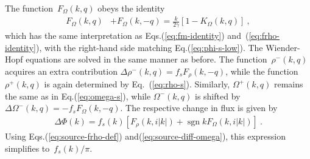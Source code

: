 \documentclass[preprint,aps,eqsecnum, prb]{revtex4-1}
\newcommand{\fplus}[1]{{#1}^{+}}
\newcommand{\fminus}[1]{{#1}^{-}}
\renewcommand{\Im}{\mathop{\mathrm{Im}}\nolimits}
\newcommand{\sgn}{\mathop{\mathrm{sgn}}\nolimits}
\begin{document}
The function~$F_\Omega(k, q)$ obeys the identity
\begin{align}
\label{eq:fomega-identity}
F_\Omega(k, q) & + F_\Omega(k, -q)
        = \frac{k}{2\gamma} \left[1 - K_\Omega(k, q)\right]
\ ,
\end{align}
which has the same interpretation as Eqs.(\ref{eq:fm-identity})
and~(\ref{eq:frho-identity}), with the right-hand side
matching Eq.(\ref{eq:phi-s-low}).
The Wiender-Hopf equations are solved in the same manner as before.
The function~$\fminus{\rho}(k, q)$ acquires an extra contribution
$\Delta \fminus{\rho}(k, q) = f_s F_\rho(k, -q)$, while
the function~$\fplus{\rho}(k, q)$ is again determined 
by Eq.~(\ref{eq:rho-s}). Similarly, $\fplus{\Omega}(k, q)$
remains the same as in Eq.(\ref{eq:omega-s}),
while $\fminus{\Omega}(k, q)$
is shifted by~$\Delta\fminus{\Omega}(k, q) = - f_s F_\Omega(k, -q)$.
The respective change in flux is given by
\begin{align}
\Delta \Phi(k)
= f_s(k) \left[F_\rho(k, i|k|) + \sgn k F_\Omega(k, i|k|)\right]
\ .
\end{align}
Using Eqs.(\ref{eq:source-frho-def})
and(\ref{eq:source-diff-omega}),
this expression simplifies to~$f_s(k) / \pi$. 



\end{document}
